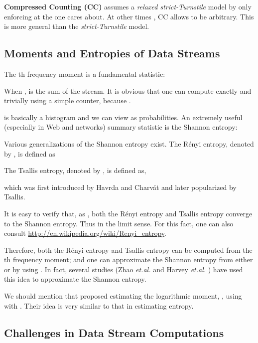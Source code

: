 \documentclass{sig-alternate}
\begin{document}
\textbf{Compressed Counting (CC)} assumes a {\em relaxed strict-Turnstile} model by only enforcing  at the  one cares about.  At other times ,  CC allows  to be arbitrary. This is more general than the {\em strict-Turnstile} model.




\subsection{Moments and Entropies of Data Streams}

The th frequency moment is a fundamental statistic:

\noindent When ,  is the sum of the stream. It is obvious that one can compute  exactly and trivially using a simple counter, because .


 is basically a histogram and we can view  as probabilities. An extremely useful (especially in Web and networks\cite{Proc:Zhao_IMC07,Proc:Mei_WSDM08}) summary statistic is the Shannon entropy:


Various generalizations of the Shannon entropy exist. The R\'enyi entropy\cite{Proc:Renyi_61}, denoted by , is defined as

The Tsallis entropy\cite{Article:Havrda_67,Article:Tsallis_88}, denoted by ,  is defined as,

\noindent which was first introduced by Havrda and Charv\'at\cite{Article:Havrda_67} and later popularized by Tsallis\cite{Article:Tsallis_88}.

It is easy to verify that, as , both the R\'enyi entropy and Tsallis entropy  converge to the Shannon entropy. Thus  in the limit sense. For this fact, one can also consult \url{http://en.wikipedia.org/wiki/Renyi_entropy}.

Therefore, both the R\'enyi entropy and Tsallis entropy can be computed from the th frequency moment; and one can approximate the Shannon entropy from either  or  by using . In fact, several studies (Zhao {\em et.al.} \cite{Proc:Zhao_IMC07} and Harvey {\em et.al.} \cite{Article:Harvey_entropy_arXiv08,Proc:Harvey_FOCS08})   have used this idea to approximate the Shannon entropy. 

We should mention that \cite{Article:Li_CC} proposed estimating the logarithmic moment, , using  with . Their idea is very similar to that in estimating entropy. 


\subsection{Challenges in Data Stream Computations}
\end{document}
